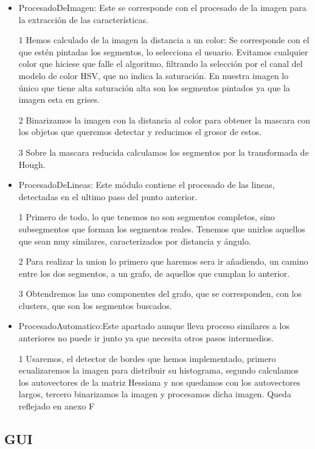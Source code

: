 \begin{itemize}
\item ProcesadoDeImagen: Este se corresponde con el procesado de la imagen para la extracción de las características.

1 Hemos calculado de la imagen la distancia a un color: Se corresponde con el que estén pintadas los segmentos, lo selecciona el usuario. Evitamos cualquier color que hiciese que falle el algoritmo, filtrando la selección por el canal del modelo de color HSV, que no indica la saturación. En nuestra imagen lo único que tiene alta saturación alta son los segmentos pintados ya que la imagen esta en grises.

2 Binarizamos la imagen con la distancia al color para obtener la mascara con los objetos que queremos detectar y reducimos el grosor de estos.

3 Sobre la mascara reducida calculamos los segmentos por la transformada de Hough.

\item ProcesadoDeLineas: Este módulo contiene el procesado de las lineas, detectadas en el ultimo paso del punto anterior.

1 Primero de todo, lo que tenemos no son segmentos completos, sino subsegmentos que forman los segmentos reales. Tenemos que unirlos aquellos que sean muy similares, caracterizados por distancia y ángulo.

2 Para realizar la union lo primero que haremos sera ir añadiendo, un camino entre los dos segmentos, a un grafo, de aquellos que cumplan lo anterior.

3 Obtendremos las uno componentes del grafo, que se corresponden, con los clusters, que son los segmentos buscados.

\item ProcesadoAutomatico:Este apartado aunque lleva proceso similares a los anteriores no puede ir junto ya que necesita otros pasos intermedios.

1 Usaremos, el detector de bordes que hemos implementado, primero ecualizaremos la imagen para distribuir su histograma, segundo calculamos los autovectores de la matriz Hessiana y nos quedamos con los autovectores largos, tercero binarizamos la imagen y procesamos dicha imagen. Queda reflejado en anexo F
\end{itemize}

\subsection{GUI}

